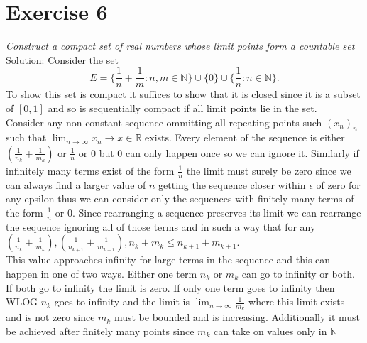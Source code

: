 \documentclass[11pt]{article}
\newcommand{\solution}[1]{{{\textcolor{header}{Solution:} \textcolor{solution}{#1}}}}
\begin{document}
\section{Exercise 6}
\emph{
    Construct a compact set of real numbers whose limit points form a countable set
}
\solution{
    Consider the set
    \[
        E = \{\frac{1}{n} + \frac{1}{m}: n,m \in \mathbb{N}\} \cup \{0\} \cup \{\frac{1}{n}: n \in \mathbb{N}\}
    .\] 
    To show this set is compact it suffices to show that it is closed since it is a subset of $[0,1]$ and so is sequentially compact if all limit points lie in the set.\\
    Consider any non constant sequence ommitting all repeating points such $(x_n)_n$ such that $\lim_{n\to \infty}x_n \rightarrow x \in \mathbb{R}$ exists. Every element of the sequence is
    either $(\frac{1}{n_k} + \frac{1}{m_k})$ or $\frac{1}{n}$ or $0$ but $0$ can only happen once so we can ignore it. Similarly if infinitely many terms exist of the form $\frac{1}{n}$ the limit must surely be zero
    since we can always find a larger value of $n$ getting the sequence closer within $\epsilon$ of zero for any epsilon thus we can consider only the sequences with finitely many terms of the form  $\frac{1}{n}$ or $0$.
    Since rearranging a sequence preserves its limit we can rearrange the sequence ignoring all of those terms and in such a way that for any $(\frac{1}{n_k} + \frac{1}{m_k}), (\frac{1}{n_{k+1}} + \frac{1}{m_{k+1}}), n_k + m_k \le n_{k+1} + m_{k+1} $.\\
    This value approaches infinity  for large terms in the sequence and this can happen in one of two ways. Either one term $n_k$ or $m_k$ can go to infinity or both. If both go to infinity the limit is zero. If only one term goes to infinity
    then WLOG $n_k$ goes to infinity and the limit is  $\lim_{n\to \infty} \frac{1}{m_k}$  where this limit exists and is not zero since $m_k$ must be bounded and is increasing. Additionally it must be achieved after finitely many points since $m_k$ can take on values only in $ \mathbb{N}$
}
\end{document}
